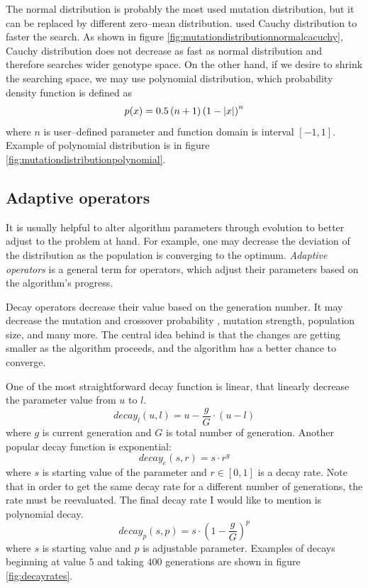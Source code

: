 The normal distribution is probably the most used mutation distribution, but it can be replaced by different zero--mean distribution. \citet*{CauchyDistributionMutation} used Cauchy distribution to faster the search. As shown in figure \ref{fig:mutationdistributionnormalcacuchy}, Cauchy distribution does not decrease as fast as normal distribution and therefore searches wider genotype space. On the other hand, if we desire to shrink the searching space, we may use polynomial distribution, which probability density function is defined as
$$
p(x)=0.5 \left(n + 1\right)\left( 1 - \left|{x}\right| \right)^n
$$ 
where $n$ is user--defined parameter and function domain is interval $\left[-1,1\right]$. Example of polynomial distribution is in figure \ref{fig:mutationdistributionpolynomial}.

\subsection{Adaptive operators}
\label{chap:adaptiveoperators}

It is usually helpful to alter algorithm parameters through evolution to better adjust to the problem at hand. For example, one may decrease the deviation of the distribution as the population is converging to the optimum. \emph{Adaptive operators} is a general term for operators, which adjust their parameters based on the algorithm's progress.

Decay operators decrease their value based on the generation number. It may decrease the mutation and crossover probability \citep{DecayGA}, mutation strength, population size, and many more. The central idea behind is that the changes are getting smaller as the algorithm proceeds, and the algorithm has a better chance to converge.

One of the most straightforward decay function is linear, that linearly decrease the parameter value from $u$ to $l$.
$$
decay_l(u,l) = u - \frac{g}{G}\cdot\left( u - l \right)
$$
where $g$ is current generation and $G$ is total number of generation. Another popular decay function is exponential:
$$
decay_e(s,r) = s\cdot r^g
$$
where $s$ is starting value of the parameter and $r\in\left[0,1\right]$ is a decay rate. Note that in order to get the same decay rate for a different number of generations, the rate must be reevaluated.
The final decay rate I would like to mention is polynomial decay.
$$
decay_p(s,p) = s \cdot\left(1 - \frac{g}{G}\right)^p
$$
where $s$ is starting value and $p$ is adjustable parameter. Examples of decays beginning at value $5$ and taking $400$ generations are shown in figure \ref{fig:decayrates}.

